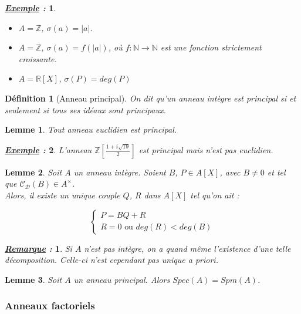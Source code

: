 \documentclass{article}           %
\newcommand\N{\mathbb{N}}
\newcommand\Z{\mathbb{Z}}
\newcommand\R{\mathbb{R}}
\newcommand\set[1]{\mathbb{#1}} 				%
\newcommand\cali[1]{\mathcal{#1}} 				%
\theoremstyle{break}
\theoremstyle{add}
\theoremstyle{break} %
\newtheorem{lemme}{Lemme}[section]
\newtheorem{definition}{Définition}[section]
\theoremstyle{add}
\newtheorem*{exemple}{\textit{\underline{Exemple} :}}
\newtheorem*{remarque}{\textit{\underline{Remarque} : }}
\newcommand\NL{
\mbox{}
\vspace*{-\parsep}
\vspace*{-\baselineskip}}
\begin{document}
\begin{exemple}\NL
\begin{itemize}
\item $A = \Z$, $\sigma(a) = |a|$.
\item $A = \Z$, $\sigma(a) = f(|a|)$, où $f : \N \longrightarrow \N$ est une fonction strictement croissante.
\item $A = \R[X]$, $\sigma(P) = deg(P)$
\end{itemize}
\end{exemple}

\begin{definition}[Anneau principal]
On dit qu'un anneau intègre est \textit{principal} si et seulement si tous ses idéaux sont principaux.
\end{definition}

\begin{lemme}
Tout anneau euclidien est principal.
\end{lemme}

\begin{exemple}
L'anneau $\Z \left[ \frac{1+i\sqrt{19}}{2} \right]$ est principal mais n'est pas euclidien.
\end{exemple}

\begin{lemme}
Soit $A$ un anneau intègre. Soient $B$, $P \in A[X]$, avec $B \neq 0$ et tel que $\cali{C_D}(B) \in A^{\times}$. \\
Alors, il existe un unique couple $Q$, $R$ dans $A[X]$ tel qu'on ait :

$$   \left \{    \begin{array}{l} P = BQ +R \\ R = 0 \textrm{ ou } deg(R) < deg(B) \end{array} \right . $$
\end{lemme}

\begin{remarque}
Si $A$ n'est pas intègre, on a quand même l'existence d'une telle décomposition. Celle-ci n'est cependant pas unique \textit{a priori}.
\end{remarque}

\begin{lemme}
Soit $A$ un anneau principal. Alors $Spec(A) = Spm(A)$.
\end{lemme}

\subsubsection{Anneaux factoriels}
\end{document}
